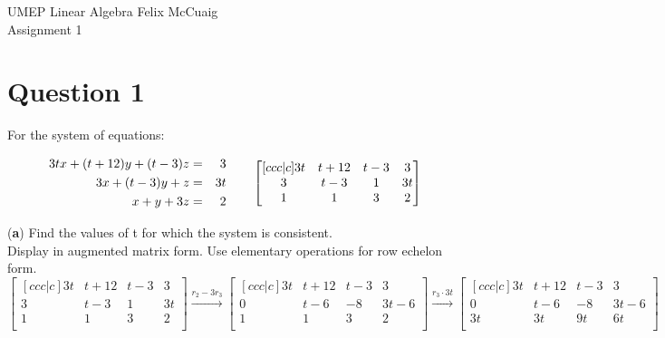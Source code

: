 \documentclass[12pt]{article}
\begin{document}
UMEP Linear Algebra \hfill Felix McCuaig \\
Assignment 1

\section*{Question 1}
For the system of equations:

\begin{align*}
\begin{aligned}
3tx + (t+12)y + (t-3)z &=& 3 \\
3x + (t-3)y + z &=& 3t \\
x+y+3z &=& 2 \\
\end{aligned} \hspace*{20px}
\begin{bmatrix}[ccc|c]
   3t & t+12 & t-3 & 3 \\
   3 & t-3 & 1 & 3t \\
   1 & 1 & 3 & 2 \\
\end{bmatrix}
\end{align*}

(\textbf{a}) Find the values of t for which the system is consistent.\\
\medskip
Display in augmented matrix form.
Use elementary operations for row echelon form.
$$
\begin{bmatrix}[ccc|c]
   3t & t+12 & t-3 & 3 \\
   3 & t-3 & 1 & 3t \\
   1 & 1 & 3 & 2 \\
\end{bmatrix} \overset{r_2-3r_3}{\longrightarrow} 
\begin{bmatrix}[ccc|c]
   3t & t+12 & t-3 & 3 \\
   0 & t-6 & -8 & 3t-6 \\
   1 & 1 & 3 & 2 \\
\end{bmatrix} \overset{r_3\cdot3t}{\longrightarrow} 
\begin{bmatrix}[ccc|c]
   3t & t+12 & t-3 & 3 \\
   0 & t-6 & -8 & 3t-6 \\
   3t & 3t & 9t & 6t \\
\end{bmatrix}
$$
\end{document}
